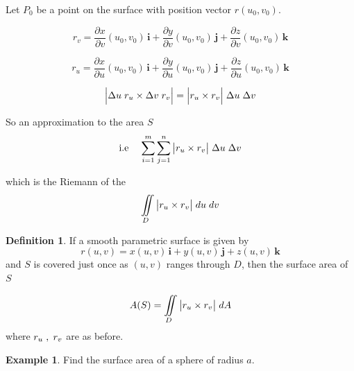\documentclass[11pt,a4paper]{article}
\theoremstyle{definition}
\newtheorem{defn}[thm]{Definition}
\newtheorem{exa}[thm]{Example}
\begin{document}
Let $P_0$ be a point on the surface with position vector $r(u_0,v_0)$.


$$r_v = \frac{\partial x}{\partial v}(u_0,v_0)\,\textbf{i} +   \frac{\partial y}{\partial v}(u_0,v_0)\,\textbf{j} +  \frac{\partial z}{\partial v}(u_0,v_0)\,\textbf{k}$$

$$r_u = \frac{\partial x}{\partial u}(u_0,v_0)\,\textbf{i} +   \frac{\partial y}{\partial u}(u_0,v_0)\,\textbf{j} +  \frac{\partial z}{\partial u}(u_0,v_0)\,\textbf{k}$$


$$\Big| \Delta u \hspace{0.1cm} r_u \times \Delta v \hspace{0.1cm} r_v\Big| = \Big| r_u \times r_v\Big| \hspace{0.1cm}\Delta u \hspace{0.1cm} \Delta v$$

So an approximation to the area $S$ $$\text{i.e}\hspace{0.4cm} \sum^m_{i=1}\sum^n_{j= 1}\big| r_u \times r_v\big| \hspace{0.1cm}\Delta u \hspace{0.1cm} \Delta v$$

which is the Riemann of the $$\iint\limits_D \big| r_u \times r_v\big| \hspace{0.1cm} du\hspace{0.1cm} dv$$


\begin{defn}


If a smooth parametric surface is given by 
$$r(u,v) = x (u,v)\, \textbf{i} +  y (u,v) \,\textbf{j}  +  z (u,v) \,\textbf{k}$$ and $S$ is covered just once as $(u,v)$ ranges through $D$, then the surface area of $S$ 

$$A(S) = \iint\limits_D \big| r_u \times r_v \big| \hspace{0.1cm}dA$$ where $r_u\hspace{0.1cm}, \hspace{0.1cm} r_v$ are as before.
\end{defn}


\begin{exa}


Find the surface area of a sphere of radius $a$.


\end{exa}
\end{document}

